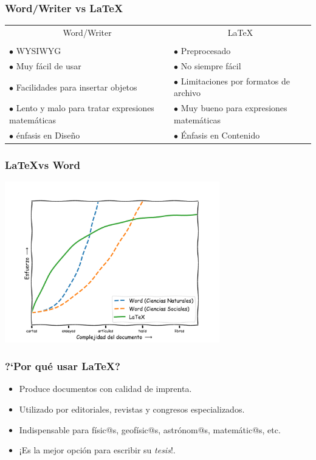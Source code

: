 \documentclass[hyperref={colorlinks},aspectratio=169]{beamer}
\begin{document}
\begin{frame}[fragile]\frametitle{Word/Writer vs \LaTeX}
\begin{center}
\begin{tabular}{p{}p{}}
\multicolumn{1}{c}{Word/Writer	}     & \multicolumn{1}{c}{\LaTeX}      \\
\\

$\bullet$ WYSIWYG            & $\bullet$ Preprocesado          \\
$\bullet$ Muy fácil de usar & $\bullet$ No siempre fácil     \\
$\bullet$ Facilidades para insertar objetos 
                             & $\bullet$ Limitaciones por formatos de archivo \\[1ex]
$\bullet$ Lento y malo para tratar expresiones matemáticas
                             & $\bullet$ Muy bueno para expresiones matemáticas \\
$\bullet$ énfasis en Dise\~no & $\bullet$ Énfasis en Contenido         
\end{tabular}
\end{center}
\end{frame}

\begin{frame}[fragile]\frametitle{\LaTeX vs Word}
\begin{center}
	\includegraphics[height=7cm]{figs/LaTeX_vs_Word-2.pdf}
\end{center}
\end{frame}

\begin{frame}[fragile]\frametitle{?`Por qué usar \LaTeX?}
\begin{itemize}
\item Produce documentos con calidad de imprenta.
\item Utilizado por editoriales, revistas y congresos especializados.
\item Indispensable para físic@s, geofísic@s, astrónom@s, matemátic@s, etc.
\item ¡Es la mejor opción para escribir su \emph{tesis}!.
\end{itemize}
\end{frame}
\end{document}
